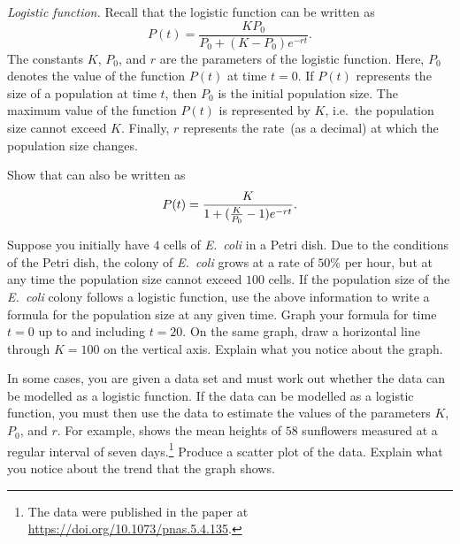 \documentclass[a4paper,oneside,12pt]{article}
\begin{document}
\begin{problem}
\item\emph{Logistic function.}
  Recall that the logistic function can be written as
  \begin{equation}
  \label{eqn:logarithm:logistic_function}
  P(t)
  =
  \frac{
    KP_0
  }{
    P_0 + (K - P_0) e^{-rt}
  }.
  \end{equation}
  The constants $K$, $P_0$, and $r$ are the parameters of the logistic
  function.  Here, $P_0$ denotes the value of the function $P(t)$ at
  time $t = 0$.  If $P(t)$ represents the size of a population at time
  $t$, then $P_0$ is the initial population size.  The maximum value
  of the function $P(t)$ is represented by $K$, i.e.~the population
  size cannot exceed $K$.  Finally, $r$ represents the rate~(as a
  decimal) at which the population size changes.
  \begin{packedenum}
  \item\label{subprob:logarithm:logistic_equivalent_form}
    Show that  can also be
    written as
    \begin{equation}
    \label{eqn:logarithm:logistic_equivalent_form}
    P(t)
    =
    \frac{
      K
    }{
      1 + \lparen\frac{K}{P_0} - 1\rparen e^{-rt}
    }.
    \end{equation}

  \item\label{subprob:logarithm:logistic_Ecoli_example}
    Suppose you initially have $4$ cells of \emph{E.~coli} in a Petri
    dish.  Due to the conditions of the Petri dish, the colony of
    \emph{E.~coli} grows at a rate of $50\%$ per hour, but at any time
    the population size cannot exceed $100$ cells.  If the population
    size of the \emph{E.~coli} colony follows a logistic function, use
    the above information to write a formula for the population size
    at any given time.  Graph your formula for time $t = 0$ up to and
    including $t = 20$.  On the same graph, draw a horizontal line
    through $K = 100$ on the vertical axis.  Explain what you notice
    about the graph.

  \item\label{subprob:logarithm:logistic_sunflower_data}
    In some cases, you are given a data set and must work out whether
    the data can be modelled as a logistic function.  If the data can
    be modelled as a logistic function, you must then use the data to
    estimate the values of the parameters $K$, $P_0$, and $r$.  For
    example,  shows the mean heights of
    $58$ sunflowers measured at a regular interval of seven
    days.\footnote{
      The data were published in the paper at
      \url{https://doi.org/10.1073/pnas.5.4.135}.
    }
    Produce a scatter plot of the data.  Explain what you notice about
    the trend that the graph shows.


\end{packedenum}
\end{problem}
\end{document}
